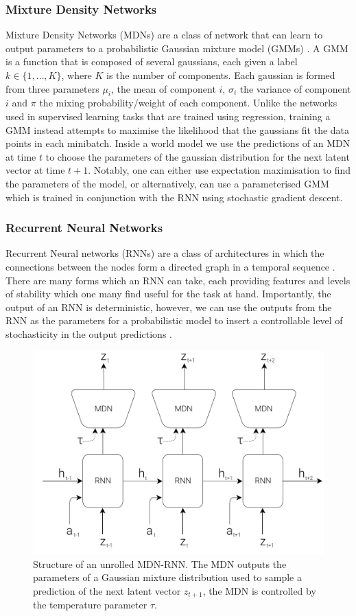 \subsubsection{Mixture Density Networks}
Mixture Density Networks (MDNs) are a class of network that can learn to output parameters to a probabilistic Gaussian mixture model (GMMs) \cite{bishop1994mixture}. A GMM is a function that is composed of several gaussians, each given a label $k \in \lbrace 1, \ldots, K \rbrace$, where $K$ is the number of components. Each gaussian is formed from three parameters $\mu_i$, the mean of component $i$, $\sigma_i$ the variance of component $i$ and $\pi$ the mixing probability/weight of each component. Unlike the networks used in supervised learning tasks that are trained using regression, training a GMM instead attempts to maximise the likelihood that the gaussians fit the data points in each minibatch. Inside a world model we use the predictions of an MDN at time $t$ to choose the parameters of the gaussian distribution for the next latent vector at time $t+1$. Notably, one can either use expectation maximisation to find the parameters of the model, or alternatively, can use a parameterised GMM which is trained in conjunction with the RNN using stochastic gradient descent.


\subsubsection{Recurrent Neural Networks}
Recurrent Neural networks (RNNs) are a class of architectures in which the connections between the nodes form a directed graph in a temporal sequence \cite{650093}. There are many forms which an RNN can take, each providing features and levels of stability which one many find useful for the task at hand. Importantly, the output of an RNN is deterministic, however, we can use the outputs from the RNN as the parameters for a probabilistic model to insert a controllable level of stochasticity in the output predictions \cite{graves2014generating}.

\begin{figure}[ht]
  \centering
  \includegraphics[width=0.75\columnwidth]{sections/4rlopt/images/mdnrnn.png}
  \caption[Temporally unrolled MDN-RNN]{Structure of an unrolled MDN-RNN. The MDN outputs the parameters of a Gaussian mixture distribution used to sample a prediction of the next latent vector $z_{t+1}$, the MDN is controlled by the temperature parameter $\tau$.}
  \label{fig:rl:mdnrnn}
\end{figure}

